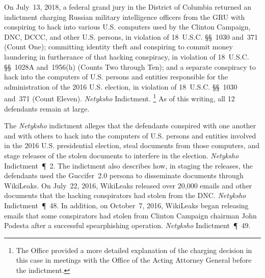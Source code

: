 On July~13, 2018, a federal grand jury in the District of Columbia returned an indictment charging Russian military intelligence officers from the GRU with conspiring to hack into various U.S. computers used by the Clinton Campaign, DNC, DCCC, and other U.S. persons, in violation of 18~U.S.C. \S\S~1030 and~371 (Count One); committing identity theft and conspiring to commit money laundering in furtherance of that hacking conspiracy, in violation of 18~U.S.C. \S\S~1028A and~1956(h) (Counts Two through Ten); and a separate conspiracy to hack into the computers of U.S. persons and entities responsible for the administration of the 2016 U.S. election, in violation of 18~U.S.C. \S\S~1030 and~371 (Count Eleven).
\textit{Netyksho} Indictment.%
\footnote{The Office provided a more detailed explanation of the charging decision in this case in meetings with the Office of the Acting Attorney General before the indictment.}
As of this writing, all 12 defendants remain at large.

The \textit{Netyksho} indictment alleges that the defendants conspired with one another and with others to hack into the computers of U.S. persons and entities involved in the 2016 U.S. presidential election, steal documents from those computers, and stage releases of the stolen documents to interfere in the election.
\textit{Netyksho} Indictment~\P~2.
The indictment also describes how, in staging the releases, the defendants used the Guccifer~2.0 persona to disseminate documents through WikiLeaks.
On July~22, 2016, WikiLeaks released over 20,000 emails and other documents that the hacking conspirators had stolen from the DNC\null.
\textit{Netyksho} Indictment~\P~48.
In addition, on October~7, 2016, WikiLeaks began releasing emails that some conspirators had stolen from Clinton Campaign chairman John Podesta after a successful spearphishing operation.
\textit{Netyksho} Indictment~\P~49.




